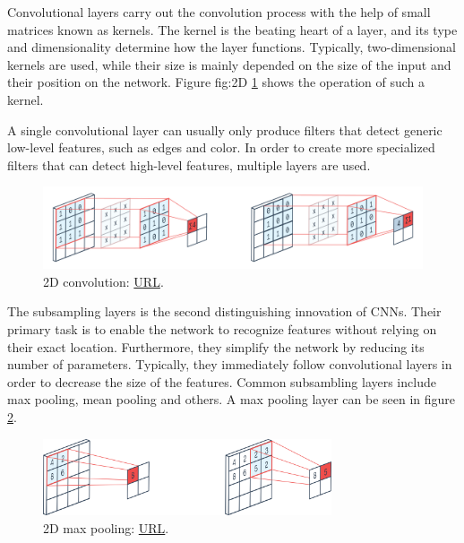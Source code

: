 Convolutional layers carry out the convolution process with the help of small matrices known as kernels. The kernel is the beating heart of a layer, and its type and dimensionality determine how the layer functions. Typically, two-dimensional kernels are used, while their size is mainly depended on the size of the input and their position on the network. Figure fig:2D \ref{fig:2D convolution} shows the operation of such a kernel.

A single convolutional layer can usually only produce filters that detect generic low-level features, such as edges and color. In order to create more specialized filters that can detect high-level features, multiple layers are used.

\begin{figure}[H]
    \centering
        \includegraphics[width=1\textwidth]{Images/ANNArchitectures/2d_convolution.png}
        \decoRule
        \caption[2D convolution]{2D convolution: \href{https://peltarion.com/knowledge-center/documentation/modeling-view/build-an-ai-model/blocks/2d-convolution}{URL}.}
        \label{fig:2D convolution}
\end{figure}

The subsampling layers is the second distinguishing innovation of CNNs. Their primary task is to enable the network to recognize features without relying on their exact location. Furthermore, they simplify the network by reducing its number of parameters. Typically, they immediately follow convolutional layers in order to decrease the size of the features. Common subsambling layers include max pooling, mean pooling and others. A max pooling layer can be seen in figure \ref{fig:2D max pooling}.

\begin{figure}[H]
    \centering
        \includegraphics[width=0.76\textwidth]{Images/ANNArchitectures/2d_max_pooling.png}
        \decoRule
        \caption[2D max pooling]{2D max pooling: \href{https://peltarion.com/knowledge-center/documentation/modeling-view/build-an-ai-model/blocks/max-pooling-2d}{URL}.}
        \label{fig:2D max pooling}
\end{figure}

